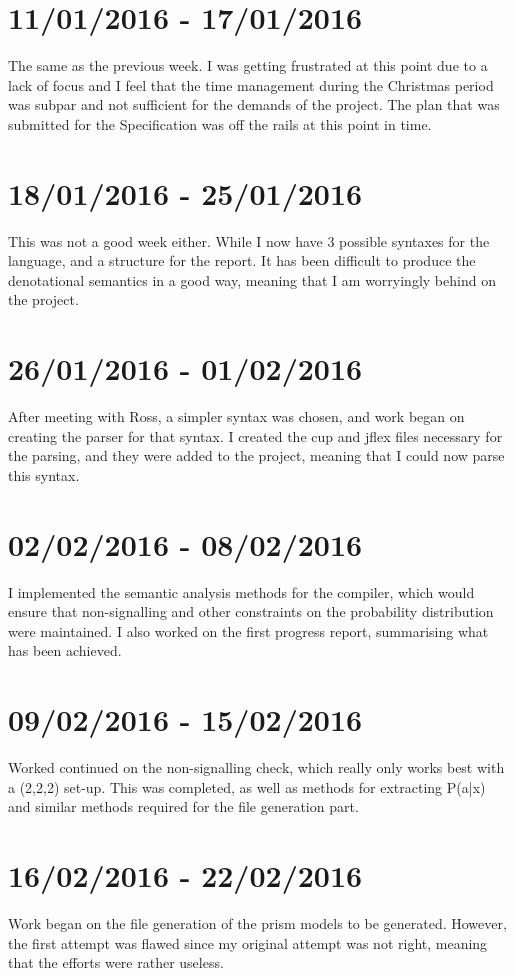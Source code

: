 \documentclass[11pt, a4paper]{article}
\begin{document}
\section{11/01/2016 - 17/01/2016}
The same as the previous week. I was getting frustrated at this point due to a
lack of focus and I feel that the time management during the Christmas period
was subpar and not sufficient for the demands of the project. The plan that was
submitted for the Specification was off the rails at this point in time.

\section{18/01/2016 - 25/01/2016}
This was not a good week either. While I now have 3 possible syntaxes for the
language, and a structure for the report. It has been difficult to produce the
denotational semantics in a good way, meaning that I am worryingly behind on the
project.

\section{26/01/2016 - 01/02/2016}
After meeting with Ross, a simpler syntax was chosen, and work began on creating
the parser for that syntax. I created the cup and jflex files necessary for the
parsing, and they were added to the project, meaning that I could now parse this
syntax.

\section{02/02/2016 - 08/02/2016}
I implemented the semantic analysis methods for the compiler, which would ensure
that non-signalling and other constraints on the probability distribution were
maintained. I also worked on the first progress report, summarising what has
been achieved.

\section{09/02/2016 - 15/02/2016}
Worked continued on the non-signalling check, which really only works best with
a (2,2,2) set-up. This was completed, as well as methods for extracting P(a|x)
and similar methods required for the file generation part.

\section{16/02/2016 - 22/02/2016}
Work began on the file generation of the prism models to be generated. However,
the first attempt was flawed since my original attempt was not right, meaning
that the efforts were rather useless.
\end{document}
